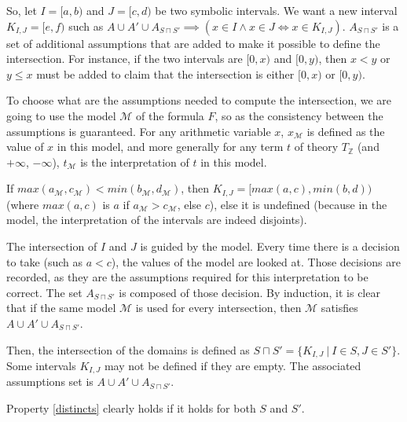 So, let $I = [a, b)$ and $J = [c, d)$ be two symbolic intervals. We want a new
interval $K_{I, J} = [e, f)$ such as
$A \cup A' \cup A_{S \sqcap S'} \implies \left(x \in I \land x \in J \iff x \in K_{I, J}\right)$.
$A_{S \sqcap S'}$ is a set of additional assumptions that are added to make it possible to define
the
intersection. For instance, if the two intervals are $[0, x)$ and $[0, y)$, then $x < y$ or $y \le x$
must be added to claim that the intersection is either $[0, x)$ or $[0, y)$.

To choose what are the assumptions needed to compute the intersection, we are going to use the model
$\mathcal{M}$
of the formula $F$, so as the consistency between the assumptions is guaranteed. For any arithmetic variable $x$, $x_\mathcal{M}$ is
defined as the value of $x$ in this model, and more generally for any
term $t$ of theory $T_{\mathbb{Z}}$ (and $+\infty$, $-\infty$),
$t_{\mathcal{M}}$ is the interpretation of $t$ in this model.


If
$max(a_\mathcal{M}, c_\mathcal{M}) < min(b_\mathcal{M}, d_\mathcal{M})$,
then $K_{I, J} = [max(a, c), min(b, d))$ (where $max(a, c)$ is $a$
if $a_\mathcal{M} > c_\mathcal{M}$, else $c$), else it is undefined
(because in the model, the interpretation of the intervals are indeed
disjoints).

The intersection of $I$ and $J$ is guided by the model.
Every time there is a decision to take (such as $a < c$), the values
of the model are looked at. Those decisions are recorded, as they
are the assumptions required for this interpretation to be correct. The
set $A_{S\sqcap S'}$ is composed of those decision. By induction, it is clear that if the same model
$\mathcal{M}$ is used for every intersection, then $\mathcal{M}$ satisfies $A \cup A' \cup A_{S \sqcap S'}$.


Then, the intersection of the domains is defined as
$S \sqcap S' = \{ K_{I, J} \ |\ I \in S, J \in S' \}$. Some intervals $K_{I, J}$ may not be defined
if they are empty. The associated assumptions set is $A \cup A' \cup A_{S \sqcap S'}$.

Property \ref{distincts} clearly holds if it holds for both $S$ and $S'$.

